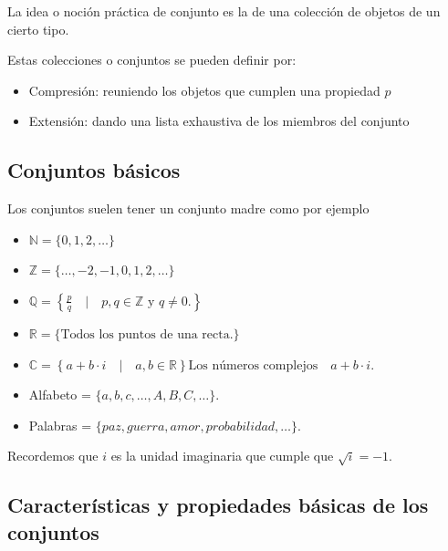 \documentclass[]{book}
\providecommand{\tightlist}{%
  \setlength{\itemsep}{0pt}\setlength{\parskip}{0pt}}
\begin{document}
La idea o noción práctica de conjunto es la de una colección de objetos de un cierto tipo.

Estas colecciones o conjuntos se pueden definir por:

\begin{itemize}
\tightlist
\item
  Compresión: reuniendo los objetos que cumplen una propiedad \(p\)
\item
  Extensión: dando una lista exhaustiva de los miembros del conjunto
\end{itemize}

\hypertarget{conjuntos-buxe1sicos}{%
\subsection{Conjuntos básicos}\label{conjuntos-buxe1sicos}}

Los conjuntos suelen tener un conjunto madre como por ejemplo

\begin{itemize}
\tightlist
\item
  \(\mathbb{N}=\{0,1,2,\ldots\}\)
\item
  \(\mathbb{Z}=\{\ldots,-2,-1,0,1,2,\ldots\}\)
\item
  \(\mathbb{Q}=\left\{\frac{p}{q}\quad\Big|\quad p,q\in \mathbb{Z} \mbox{ y } q \not= 0.\right\}\)
\item
  \(\mathbb{R}=\{\mbox{Todos los puntos de una recta.}\}\)
\item
  \(\mathbb{C}= \left\{a+b\cdot i\quad \big|\quad a,b\in \mathbb{R}\right\}\mbox{Los números complejos}\quad a+b\cdot i.\)
\item
  Alfabeto = \(\{a,b,c,\ldots, A,B,C,\ldots\}.\)
\item
  Palabras = \(\{paz, guerra, amor, probabilidad,\ldots\}.\)
\end{itemize}

Recordemos que \(i\) es la unidad imaginaria que cumple que \(\sqrt{i}=-1\).

\hypertarget{caracteruxedsticas-y-propiedades-buxe1sicas-de-los-conjuntos}{%
\subsection{Características y propiedades básicas de los conjuntos}\label{caracteruxedsticas-y-propiedades-buxe1sicas-de-los-conjuntos}}
\end{document}
